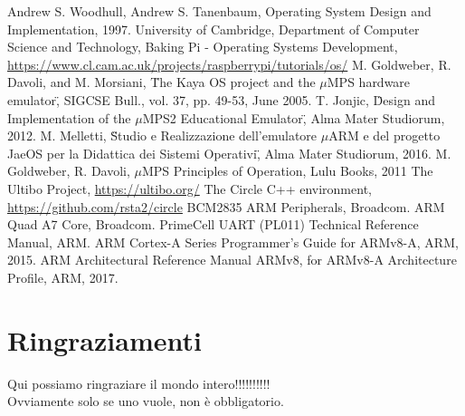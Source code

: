 \documentclass[12pt,a4paper,openright,twoside]{report}
\begin{document}
\begin{thebibliography}{90}             %
 Andrew S. Woodhull, Andrew S. Tanenbaum, 
                Operating System Design and Implementation, 1997.
 University of Cambridge, Department of Computer Science and Technology,
                    Baking Pi - Operating Systems Development,
                    \url{https://www.cl.cam.ac.uk/projects/raspberrypi/tutorials/os/}
 M. Goldweber, R. Davoli, and M. Morsiani,
                        \"The Kaya OS project and the $\mu$MPS hardware emulator\",
                          SIGCSE Bull., vol. 37, pp. 49-53, June 2005.
 T. Jonjic,
                    \"Design and Implementation of the $\mu$MPS2 Educational Emulator\",
                    Alma Mater Studiorum, 2012.
 M. Melletti,
                    \"Studio e Realizzazione dell'emulatore $\mu$ARM e del progetto
                    JaeOS per la Didattica dei Sistemi Operativi\",
                    Alma Mater Studiorum, 2016.
 M. Goldweber, R. Davoli, $\mu$MPS Principles of Operation, Lulu Books, 2011
 The Ultibo Project, \url{https://ultibo.org/}
 The Circle C++ environment, \url{https://github.com/rsta2/circle}
 BCM2835 ARM Peripherals, Broadcom.
 ARM Quad A7 Core, Broadcom.
 PrimeCell UART (PL011) Technical Reference Manual, ARM.
 ARM Cortex-A Series Programmer's Guide for ARMv8-A, ARM, 2015.
 ARM Architectural Reference Manual ARMv8, for ARMv8-A Architecture Profile, ARM, 2017.
\end{thebibliography}
\clearpage{\pagestyle{empty}\cleardoublepage}
\chapter*{Ringraziamenti}
\thispagestyle{empty}
Qui possiamo ringraziare il mondo intero!!!!!!!!!!\\
Ovviamente solo se uno vuole, non \`e obbligatorio.
\end{document}
